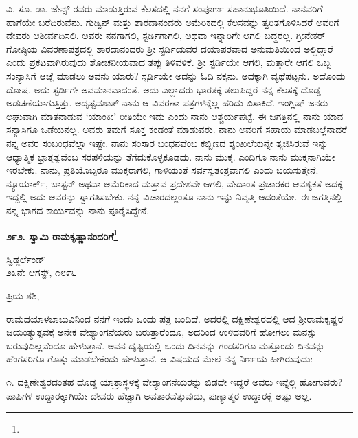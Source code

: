 ವಿ. ಸೂ.\enginline{-} ಡಾ. ಜೇನ್ಸ್ ರವರು ಮಾಡುತ್ತಿರುವ ಕೆಲಸದಲ್ಲಿ ನನಗೆ ಸಂಪೂರ್ಣ ಸಹಾನುಭೂತಿಯಿದೆ. ನಾನವರಿಗೆ ಹಾಗೆಯೇ ಬರೆದಿರುವೆನು. ಗುಡ್ವಿನ್ ಮತ್ತು ಶಾರದಾನಂದರು ಅಮೆರಿಕದಲ್ಲಿ ಕೆಲಸವನ್ನು ತ್ವರಿತಗೊಳಿಸಿದರೆ ಅವರಿಗೆ ದೇವರು ಆಶೀರ್ವದಿಸಲಿ. ಅವರು ನನಗಾಗಲಿ, ಸ್ಟರ್ಡಿಗಾಗಲಿ, ಅಥವಾ ಇನ್ನಾರಿಗೇ ಆಗಲಿ ಬದ್ಧರಲ್ಲ. ಗ್ರೀನೇಕರ್‌ ಗೋಷ್ಠಿಯ ವಿವರಣಾಪತ್ರದಲ್ಲಿ ಶಾರದಾನಂದರು ಶ‍್ರೀ ಸ್ಟರ್ಡಿಯವರ ದಯಾಪರವಾದ ಅನುಮತಿಯಿಂದ ಅಲ್ಲಿದ್ದಾರೆ ಎಂದು ಪ್ರಕಟವಾಗಿರುವುದು ಶೋಚನೀಯವಾದ ತಪ್ಪು ತಿಳಿವಳಿಕೆ. ಶ‍್ರೀ ಸ್ಟರ್ಡಿಯೇ ಆಗಲಿ, ಮತ್ತಾರೇ ಆಗಲಿ ಒಬ್ಬ ಸಂನ್ಯಾಸಿಗೆ ಆಜ್ಞೆ ಮಾಡಲು ಅವನು ಯಾರು? ಸ್ಟರ್ಡಿಯೇ ಅದನ್ನು ಓದಿ ನಕ್ಕನು. ಅದಕ್ಕಾಗಿ ವ್ಯಥೆಪಟ್ಟನು. ಅದೊಂದು ದೋಷ. ಅದು ಸ್ಟರ್ಡಿಗೇ ಅವಮಾನವಾದಂತೆ. ಅದು ಎಲ್ಲಾದರು ಭಾರತಕ್ಕೆ ತಲುಪಿದ್ದರೆ ನನ್ನ ಕೆಲಸಕ್ಕೆ ದೊಡ್ಡ ಅಡಚಣೆಯಾಗುತ್ತಿತ್ತು. ಅದೃಷ್ಟವಶಾತ್ ನಾನು ಆ ವಿವರಣಾ ಪತ್ರಗಳನ್ನೆಲ್ಲ ಹರಿದು ಬಿಸಾಕಿದೆ. ಇಂಗ್ಲಿಷ್ ಜನರು ಲಘುವಾಗಿ ಮಾತನಾಡುವ `ಯಾಂಕೀ' ರೀತಿಯೇ ಇದು\enginline{-} ಎಂದು ನಾನು ಆಶ್ಚರ್ಯಪಟ್ಟೆ. ಈ ಜಗತ್ತಿನಲ್ಲಿ ನಾನು ಯಾವ ಸನ್ಯಾಸಿಗೂ ಒಡೆಯನಲ್ಲ. ಅವರು ತಮಗೆ ಸೂಕ್ತ ಕಂಡಂತೆ ಮಾಡುವರು. ನಾನು ಅವರಿಗೆ ಸಹಾಯ ಮಾಡಬಲ್ಲೆನಾದರೆ\enginline{-} ನನ್ನ ಅವರ ಸಂಬಂಧವೆಲ್ಲಾ ಇಷ್ಟೇ. ನಾನು ಸಂಸಾರ ಬಂಧನವೆಂಬ ಕಬ್ಬಿಣದ ಶೃಂಖಲೆಯನ್ನೇ ತ್ಯಜಿಸಿರುವೆ\enginline{-} ಇನ್ನು ಆಧ್ಯಾತ್ಮಿಕ ಭ್ರಾತೃತ್ವವೆಂಬ ಸರಪಳಿಯನ್ನು ತೆಗೆದುಕೊಳ್ಳಕೂಡದು. ನಾನು ಮುಕ್ತ. ಎಂದಿಗೂ ನಾನು ಮುಕ್ತನಾಗಿಯೇ ಇರಬೇಕು. ನಾನು, ಪ್ರತಿಯೊಬ್ಬರೂ ಮುಕ್ತರಾಗಲಿ, ಗಾಳಿಯಂತೆ ಸರ್ವಸ್ವತಂತ್ರವಾಗಲಿ ಎಂದು ಬಯಸುತ್ತೇನೆ. ನ್ಯೂಯಾರ್ಕ್, ಬಾಸ್ಟನ್ ಅಥವಾ ಅಮೆರಿಕಾದ ಮತ್ತಾವ ಪ್ರದೇಶವೇ ಆಗಲಿ, ವೇದಾಂತ ಪ್ರಚಾರಕರ ಆವಶ್ಯಕತೆ ಅದಕ್ಕೆ ಇದ್ದಲ್ಲಿ ಅದು ಅವರನ್ನು ಸ್ವಾಗತಿಸಬೇಕು. ನನ್ನ ವಿಚಾರದಲ್ಲಂತೂ ನಾನು ಇನ್ನು ನಿವೃತ್ತಿ ಆದಂತೆಯೇ. ಈ ಜಗತ್ತಿನಲ್ಲಿ ನನ್ನ ಭಾಗದ ಕಾರ್ಯವನ್ನು ನಾನು ಪೂರೈಸಿದ್ದೇನೆ.

\begin{center}
\textbf{೨೯೨. ಸ್ವಾಮಿ ರಾಮಕೃಷ್ಣಾನಂದರಿಗೆ}\footnote{}
\end{center}

\vspace{-0.5cm}

\begin{flushright}
ಸ್ವಿಡ್ಜರ್ಲೆಂಡ್\\೨೩ನೇ ಆಗಸ್ಟ್, ೧೮೯೬
\end{flushright}

\vspace{-0.3cm}

\noindent
ಪ್ರಿಯ ಶಶಿ,

ರಾಮದಯಾಳಬಾಬುವಿನಿಂದ ನನಗೆ ಇಂದು ಒಂದು ಪತ್ರ ಬಂದಿದೆ. ಅದರಲ್ಲಿ ದಕ್ಷಿಣೇಶ್ವರದಲ್ಲಿ ಆದ ಶ‍್ರೀರಾಮಕೃಷ್ಣರ ಜಯಂತ್ಯುತ್ಸವಕ್ಕೆ ಅನೇಕ ವೇಶ್ಯಾಂಗನೆಯರು ಬರುತ್ತಾರೆಂದೂ, ಅದರಿಂದ ಉಳಿದವರಿಗೆ ಹೋಗಲು ಮನಸ್ಸು ಬರುವುದಿಲ್ಲವೆಂದೂ ಹೇಳುತ್ತಾನೆ. ಅವನ ದೃಷ್ಟಿಯಲ್ಲಿ ಒಂದು ದಿನವನ್ನು ಗಂಡಸರಿಗೂ ಮತ್ತೊಂದು ದಿನವನ್ನು ಹೆಂಗಸರಿಗೂ ಗೊತ್ತು ಮಾಡಬೇಕೆಂದು ಹೇಳುತ್ತಾನೆ. ಆ ವಿಷಯದ ಮೇಲೆ ನನ್ನ ನಿರ್ಣಯ ಹೀಗಿರುವುದು:

೧. ದಕ್ಷಿಣೇಶ್ವರದಂತಹ ದೊಡ್ಡ ಯಾತ್ರಾಸ್ಥಳಕ್ಕೆ ವೇಶ್ಯಾಂಗನೆಯರನ್ನು ಬಿಡದೇ ಇದ್ದರೆ ಅವರು ಇನ್ನೆಲ್ಲಿ ಹೋಗುವರು? ಪಾಪಿಗಳ ಉದ್ದಾರಕ್ಕಾಗಿಯೇ ದೇವರು ಹೆಚ್ಚಾಗಿ ಅವತಾರವೆತ್ತುವುದು, ಪುಣ್ಯಾತ್ಮರ ಉದ್ಧಾರಕ್ಕೆ ಅಷ್ಟು ಅಲ್ಲ.

